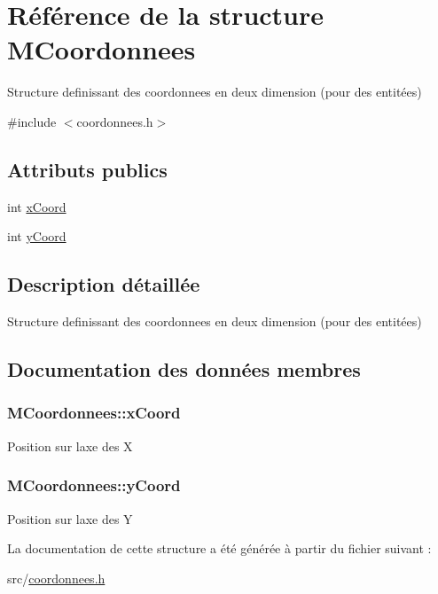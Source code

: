 \hypertarget{structMCoordonnees}{}\section{Référence de la structure M\+Coordonnees}
\label{structMCoordonnees}


Structure definissant des coordonnees en deux dimension (pour des entitées)  




{\ttfamily \#include $<$coordonnees.\+h$>$}

\subsection*{Attributs publics}
\begin{DoxyCompactItemize}
\item 
int \hyperlink{structMCoordonnees_acbeda4a908264671eff2ea4aaacc68cc}{x\+Coord}
\item 
int \hyperlink{structMCoordonnees_a161feac6dbc750cf54906e9938e0f97f}{y\+Coord}
\end{DoxyCompactItemize}


\subsection{Description détaillée}
Structure definissant des coordonnees en deux dimension (pour des entitées) 

\subsection{Documentation des données membres}
\subsubsection[{\texorpdfstring{x\+Coord}{xCoord}}]{\setlength{\rightskip}{0pt plus 5cm}M\+Coordonnees\+::x\+Coord}\hypertarget{structMCoordonnees_acbeda4a908264671eff2ea4aaacc68cc}{}\label{structMCoordonnees_acbeda4a908264671eff2ea4aaacc68cc}
Position sur l\textquotesingle{}axe des X 
\subsubsection[{\texorpdfstring{y\+Coord}{yCoord}}]{\setlength{\rightskip}{0pt plus 5cm}M\+Coordonnees\+::y\+Coord}\hypertarget{structMCoordonnees_a161feac6dbc750cf54906e9938e0f97f}{}\label{structMCoordonnees_a161feac6dbc750cf54906e9938e0f97f}
Position sur l\textquotesingle{}axe des Y 

La documentation de cette structure a été générée à partir du fichier suivant \+:\begin{DoxyCompactItemize}
\item 
src/\hyperlink{coordonnees_8h}{coordonnees.\+h}\end{DoxyCompactItemize}
